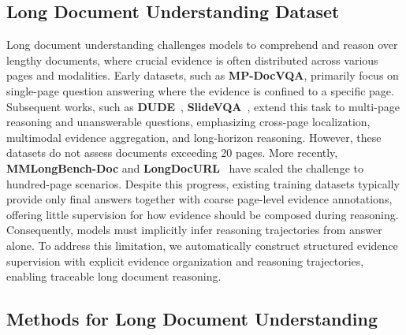\documentclass[letterpaper]{article} %
\begin{document}
\subsection{Long Document Understanding Dataset}
Long document understanding challenges models to comprehend and reason over lengthy documents, where crucial evidence is often distributed across various pages and modalities. Early datasets, such as {\bf MP-DocVQA}, primarily focus on single-page question answering where the evidence is confined to a specific page. Subsequent works, such as {\bf DUDE}~\cite{van2023document}, {\bf SlideVQA}~\cite{tanaka2023slidevqa}, extend this task to multi-page reasoning and unanswerable questions, emphasizing cross-page localization, multimodal evidence aggregation, and long-horizon reasoning. However, these datasets do not assess documents exceeding 20 pages. More recently, {\bf MMLongBench-Doc} and {\bf LongDocURL}~\cite{deng2025longdocurl}  have scaled the challenge to hundred-page scenarios. Despite this progress, existing training datasets typically provide only final answers together with coarse page-level evidence annotations, offering little supervision for how evidence should be composed during reasoning. Consequently, models must implicitly infer reasoning trajectories from answer alone. To address this limitation, we automatically construct structured evidence supervision with explicit evidence organization and reasoning trajectories, enabling traceable long document reasoning.


\subsection{Methods for Long Document Understanding}
\end{document}
